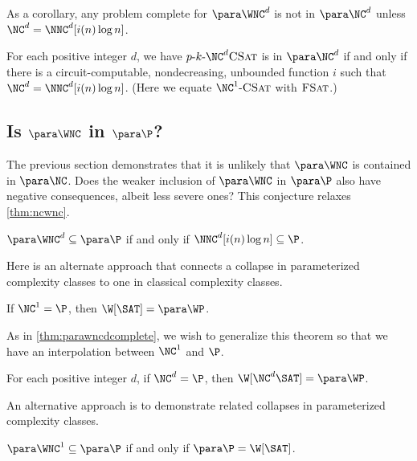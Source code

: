 As a corollary, any problem complete for $\para \WNC^d$ is not in $\para \NC^d$ unless $\NC^d = \NNC^d[i(n) \log n]$.

\begin{corollary}
  For each positive integer $d$, we have $\pNCSAT$ is in $\para \NC^d$ if and only if there is a circuit-computable, nondecreasing, unbounded function $i$ such that $\NC^d = \NNC^d[i(n) \log n]$.
  (Here we equate $\NC^1 \dash \textsc{CSat}$ with $\textsc{FSat}$.)
\end{corollary}

\subsection{Is \texorpdfstring{$\para \WNC$}{paraWNC} in \texorpdfstring{$\para \P$}{paraP}?}
\label{sec:wncp}

The previous section demonstrates that it is unlikely that $\para \WNC$ is contained in $\para \NC$.
Does the weaker inclusion of $\para \WNC$ in $\para \P$ also have negative consequences, albeit less severe ones?
This conjecture relaxes \autoref{thm:ncwnc}.

\begin{conjecture}\label{con:wncp}
  $\para \WNC^d \subseteq \para \P$ if and only if $\NNC^d[i(n) \log n] \subseteq \P$.
\end{conjecture}

Here is an alternate approach that connects a collapse in parameterized complexity classes to one in classical complexity classes.

\begin{theorem}
  If $\NC^1 = \P$, then $\W[\SAT] = \para \WP$.
\end{theorem}

As in \autoref{thm:parawncdcomplete}, we wish to generalize this theorem so that we have an interpolation between $\NC^1$ and $\P$.

\begin{conjecture}
  For each positive integer $d$, if $\NC^d = \P$, then $\W[\NC^d \SAT] = \para \WP$.
\end{conjecture}

An alternative approach is to demonstrate related collapses in parameterized complexity classes.

\begin{theorem}
  $\para \WNC^1 \subseteq \para \P$ if and only if $\para \P = \W[\SAT]$.
\end{theorem}

